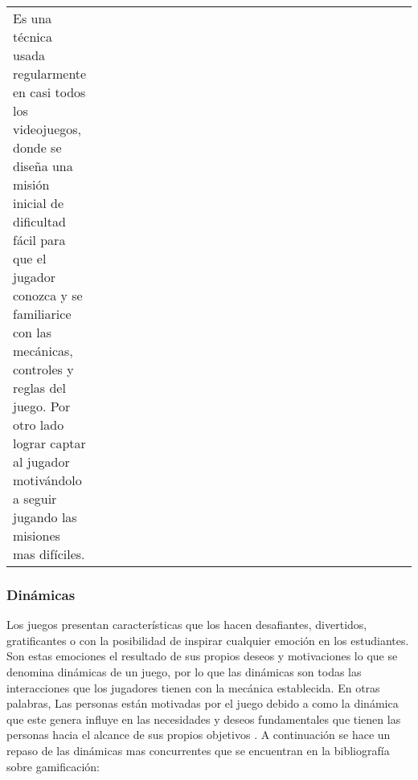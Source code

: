 \begin{longtable}{C{0.2\linewidth} P{0.8\linewidth}}
Es una técnica usada regularmente en casi todos los videojuegos, donde se diseña una misión inicial de 
dificultad fácil para que el jugador conozca y se familiarice con las mecánicas, controles y reglas del juego. 
Por otro lado lograr captar al jugador motivándolo a seguir jugando las misiones mas difíciles.
\\
\end{longtable}
\egroup

\subsubsection{Dinámicas}

Los juegos presentan características que los hacen desafiantes, divertidos, gratificantes o con la posibilidad 
de inspirar cualquier emoción en los estudiantes. Son estas emociones el resultado de sus propios deseos y 
motivaciones lo que se denomina dinámicas de un juego, por lo que las dinámicas son todas las interacciones 
que los jugadores tienen con la mecánica establecida. En otras palabras, Las personas están motivadas por el 
juego debido a como la dinámica que este genera influye en las necesidades y deseos fundamentales que tienen 
las personas hacia el alcance de sus propios objetivos \cite{DAROCHASEIXAS201648}. A continuación se hace un 
repaso de las dinámicas mas concurrentes que se encuentran en la bibliografía sobre gamificación:

